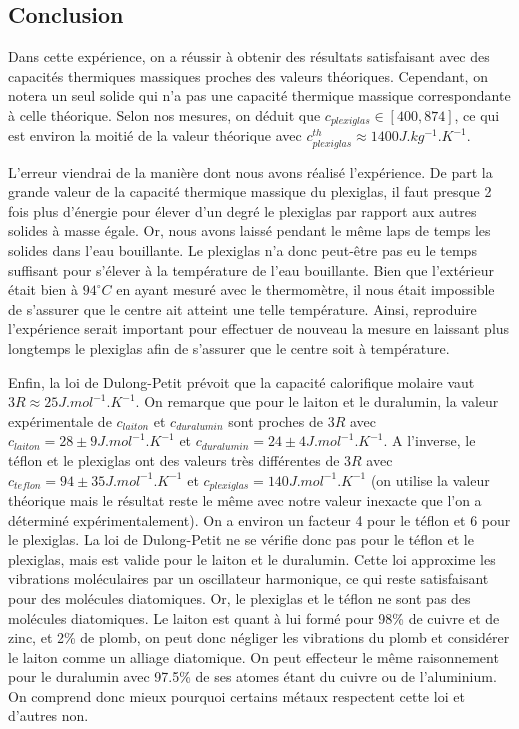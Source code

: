 \documentclass[12pt]{article}
\begin{document}
\subsection{Conclusion}
Dans cette expérience, on a réussir à obtenir des résultats satisfaisant avec des capacités thermiques massiques proches des valeurs théoriques. Cependant, on notera un seul solide qui 
n'a pas une capacité thermique massique correspondante à celle théorique. Selon nos mesures, on déduit que $c_{plexiglas} \in [400, 874]$, ce qui est environ la moitié de la valeur théorique avec $c_{plexiglas}^{th} \approx 1400 J.kg^{-1}.K^{-1}$.

L'erreur viendrai de la manière dont nous avons réalisé l'expérience. De part la grande valeur de la capacité thermique massique du plexiglas, il faut presque 2 fois plus d'énergie pour élever d'un degré le plexiglas
par rapport aux autres solides à masse égale. Or, nous avons laissé pendant le même laps de temps les solides dans l'eau bouillante. Le plexiglas n'a donc peut-être pas eu le temps suffisant pour s'élever à la température de l'eau bouillante.
Bien que l'extérieur était bien à $94^\circ C$ en ayant mesuré avec le thermomètre, il nous était impossible de s'assurer que le centre ait atteint une telle température. Ainsi, reproduire l'expérience serait important pour effectuer de nouveau la mesure
en laissant plus longtemps le plexiglas afin de s'assurer que le centre soit à température.


Enfin, la loi de Dulong-Petit prévoit que la capacité calorifique molaire vaut $3R \approx 25 J.mol^{-1}.K^{-1}$. On remarque que pour le laiton et le duralumin, 
la valeur expérimentale de $c_{laiton}$ et $c_{duralumin}$ sont proches de $3R$ avec $c_{laiton} = 28 \pm 9 J.mol^{-1}.K^{-1}$ et $c_{duralumin} = 24 \pm 4 J.mol^{-1}.K^{-1}$. 
A l'inverse, le téflon et le plexiglas ont des valeurs très différentes de $3R$ avec $c_{teflon} = 94 \pm 35 J.mol^{-1}.K^{-1}$ et $c_{plexiglas} = 140 J.mol^{-1}.K^{-1}$ 
(on utilise la valeur théorique mais le résultat reste le même avec notre valeur inexacte que l'on a déterminé expérimentalement). On a environ un facteur 4 pour le téflon et 6 pour le plexiglas. La loi de Dulong-Petit ne se vérifie donc pas pour le téflon et le plexiglas, mais est valide pour le laiton et le duralumin.
Cette loi approxime les vibrations moléculaires par un oscillateur harmonique, ce qui reste satisfaisant pour des molécules diatomiques. Or, le plexiglas et le téflon ne sont pas des molécules diatomiques. 
Le laiton est quant à lui formé pour 98\% de cuivre et de zinc, et 2\% de plomb, on peut donc négliger les vibrations du plomb et considérer le laiton comme un alliage diatomique. On peut effecteur le même raisonnement pour le duralumin avec 97.5\% de ses atomes
étant du cuivre ou de l'aluminium. On comprend donc mieux pourquoi certains métaux respectent cette loi et d'autres non.
\end{document}
